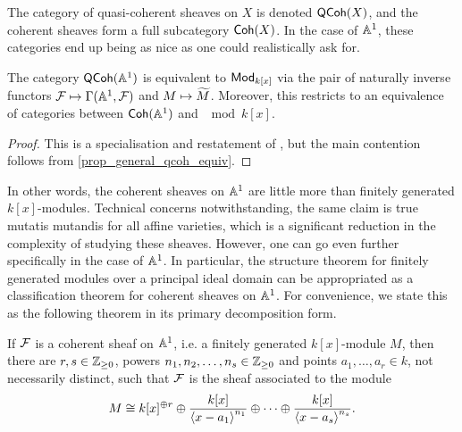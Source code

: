 The category of quasi-coherent sheaves on $X$ is denoted $\operatorname{\mathsf{QCoh}}(X)$,
and the coherent sheaves form a full subcategory $\operatorname{\mathsf{Coh}}(X)$.
In the case of $\mathbb{A}^{{1}}$, these categories end up being as nice as
one could realistically ask for.

\begin{corollary}
  \label{cor_affine_coh_equiv_to_mods}
  The category $\operatorname{\mathsf{QCoh}}(\mathbb{A}^{{1}})$ is equivalent to ${\mathsf{Mod}}_{{k[x]}}$ via the
  pair of naturally inverse functors $\mathcal{F} \mapsto
  \Gamma({\mathbb{A}^{{1}}}, {\mathcal{F}})$ and $M \mapsto \widetilde{{M}}$.
  Moreover, this restricts to an equivalence of categories between
  $\operatorname{\mathsf{Coh}}(\mathbb{A}^{{1}})$ and $\mod{k[x]}$.
\end{corollary}

\begin{proof}
  This is a specialisation and restatement of
  \cite[Corollary~II.5.5]{hartshorne}, but the main contention
  follows from \cref{prop_general_qcoh_equiv}.
\end{proof}

In other words, the coherent sheaves on $\mathbb{A}^{{1}}$ are little more
than finitely generated $k[x]$-modules.
Technical concerns notwithstanding, the same claim is true mutatis
mutandis for all affine varieties, which is a significant reduction
in the complexity of studying these sheaves.
However, one can go even further specifically in the case of $\mathbb{A}^{{1}}$.
In particular, the structure theorem for finitely generated modules
over a principal ideal domain can be appropriated as a classification
theorem for coherent sheaves on $\mathbb{A}^{{1}}$.
For convenience, we state this as the following theorem in its
primary decomposition form.

\begin{theorem}
  \label{thm_coh_sheaf_classification_of_aff_line}
  If $\mathcal{F}$ is a coherent sheaf on $\mathbb{A}^{{1}}$, i.e. a finitely
  generated $k[x]$-module $M$, then there are $r, s \in \mathbb{Z}_{\geq 0}$,
  powers $n_1, n_2, \ldots, n_s \in \mathbb{Z}_{\geq 0}$ and points $a_1, \ldots,
  a_r \in k$, not necessarily distinct, such that $\mathcal{F}$ is the
  sheaf associated to the module
  \[
    M
    \cong
    k[x]^{\oplus r} \oplus \frac{k[x]}{\left\langle {x - a_1} \right\rangle^{n_1}} \oplus
    \cdots \oplus \frac{k[x]}{\left\langle {x - a_s} \right\rangle^{n_s}}.
  \]
  \vspace{-18pt}
\end{theorem}

